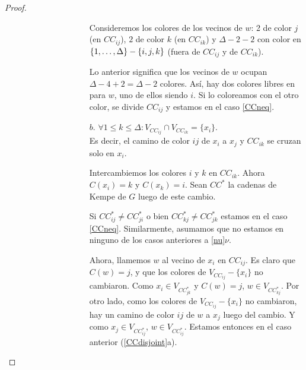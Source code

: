 \begin{proof}
\begin{enumerate}
\begin{enumerate}
\begin{enumerate}
\begin{itemize}
\begin{enumerate}
\begin{itemize}
            Consideremos los colores de los vecinos de $w$: 2 de color $j$ (en $CC_{ij}$), $2$ de color $k$ (en $CC_{ik}$) y $\Delta - 2 - 2$ con color en $\{1, \mathellipsis, \Delta\} - \{i, j, k\}$ (fuera de $CC_{ij}$ y de $CC_{ik}$).
            
            Lo anterior significa que los vecinos de $w$ ocupan $\Delta - 4 + 2 = \Delta - 2$ colores. Así, hay dos colores libres en para $w$, uno de ellos siendo $i$. Si lo coloreamos con el otro color, se divide $CC_{ij}$ y estamos en el caso \ref{CCneq}.

    \item[$b.$] $\forall 1 \le k \le \Delta \colon V_{CC_{ij}} \cap V_{CC_{ik}} = \{x_i\}$.\\
    Es decir, el camino de color $ij$ de $x_i$ a $x_j$ y $CC_{ik}$ se cruzan solo en $x_i$.
    
    Intercambiemos los colores $i$ y $k$ en $CC_{ik}$.  Ahora $C(x_i) = k$ y $C(x_k) = i$. Sean $CC^{*}$ la cadenas de Kempe de $G$ luego de este cambio.
    
    Si $CC_{ij}^{*} \ne CC_{ji}^{*}$ o bien $CC_{kj}^{*} \neq CC_{jk}^{*}$ estamos en el caso \ref{CCneq}. Similarmente, asumamos que no estamos en ninguno de los casos anteriores a \ref{nu}$\nu$.
    
    Ahora, llamemos $w$ al vecino de $x_i$ en $CC_{ij}$. Es claro que $C(w) = j$, y que los colores de $V_{CC_{ij}} - \{x_i\}$ no cambiaron. Como $x_i \in V_{CC_{jk}^{*}}$ y $C(w) = j$, $w \in V_{CC_{kj}^{*}}$. Por otro lado, como los colores de $V_{CC_{ij}} - \{x_i\}$ no cambiaron, hay un camino de color $ij$ de $w$ a $x_j$ luego del cambio. Y como $x_j \in V_{CC_{ij}^{*}}$, $w \in V_{CC_{ij}^{*}}$. Estamos entonces en el caso anterior (\ref{CCdisjoint}a).
\end{itemize}
\end{enumerate}
\end{itemize}
\end{enumerate}
\end{enumerate}
\end{enumerate}
\end{proof}
